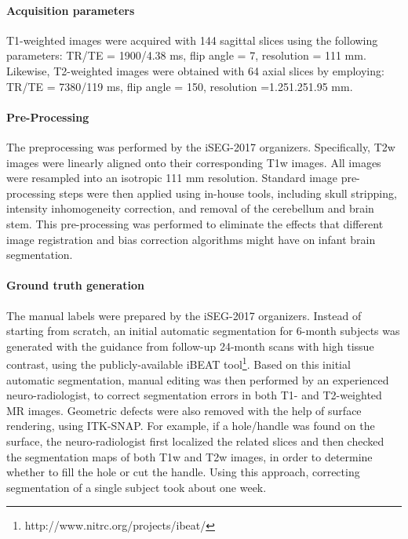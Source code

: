 \documentclass[twoside,espcrc2]{elsarticle}
\begin{document}
\paragraph{Acquisition parameters}

T1-weighted images were acquired with 144 sagittal slices using the following parameters: TR/TE = 1900/4.38 ms, flip angle = 7, resolution = 111 mm. Likewise, T2-weighted images were obtained with 64 axial slices by employing: TR/TE = 7380/119 ms, flip angle = 150, resolution =1.251.251.95 mm.

\paragraph{Pre-Processing}

The preprocessing was performed by the iSEG-2017 organizers. Specifically, T2w images were linearly aligned onto their corresponding T1w images. All images were resampled into an isotropic 111 mm resolution. Standard image pre-processing steps were then applied using in-house tools, including skull stripping, intensity inhomogeneity correction, and removal of the cerebellum and brain stem. This pre-processing was performed to eliminate the effects that different image registration and bias correction algorithms might have on infant brain segmentation. 

\paragraph{Ground truth generation}

The manual labels were prepared by the iSEG-2017 organizers. Instead of starting from scratch, an initial automatic segmentation for 6-month subjects \cite{wang2013longitudinally,wang20124d} was generated with the guidance from follow-up 24-month scans with high tissue contrast, using the publicly-available iBEAT tool\footnote{http://www.nitrc.org/projects/ibeat/}. Based on this initial automatic segmentation, manual editing was then performed by an experienced neuro-radiologist, to correct segmentation errors in both T1- and T2-weighted MR images. Geometric defects were also removed with the help of surface rendering, using ITK-SNAP. For example, if a hole/handle was found on the surface, the neuro-radiologist first localized the related slices and then checked the segmentation maps of both T1w and T2w images, in order to determine whether to fill the hole or cut the handle. Using this approach, correcting segmentation of a single subject took about one week.
\end{document}
